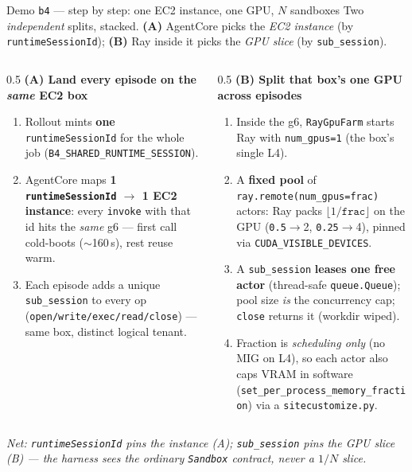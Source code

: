 \documentclass[aspectratio=169]{beamer}
\begin{document}
\begin{frame}{Demo \texttt{b4} --- step by step: one EC2 instance, one GPU, $N$ sandboxes}
  \footnotesize Two \emph{independent} splits, stacked. \textbf{(A)} AgentCore picks the \emph{EC2
  instance} (by \texttt{runtimeSessionId}); \textbf{(B)} Ray inside it picks the \emph{GPU slice} (by \texttt{sub\_session}).
  \begin{columns}[T]
    \begin{column}{0.5\textwidth}
      \textbf{(A) Land every episode on the \emph{same} EC2 box}
      \begin{enumerate}\setlength\itemsep{0.03em}
        \item[\textbf{1}] Rollout mints \textbf{one} \texttt{runtimeSessionId} for the whole job (\texttt{B4\_SHARED\_RUNTIME\_SESSION}).
        \item[\textbf{2}] AgentCore maps \textbf{1 \texttt{runtimeSessionId} $\to$ 1 EC2 instance}: every \texttt{invoke} with that id hits the \emph{same} g6 --- first call cold-boots ($\sim$160\,s), rest reuse warm.
        \item[\textbf{3}] Each episode adds a unique \texttt{sub\_session} to every op (\texttt{open/write/exec/read/close}) --- same box, distinct logical tenant.
      \end{enumerate}
    \end{column}
    \begin{column}{0.5\textwidth}
      \textbf{(B) Split that box's one GPU across episodes}
      \begin{enumerate}\setlength\itemsep{0.03em}
        \item[\textbf{4}] Inside the g6, \texttt{RayGpuFarm} starts Ray with \texttt{num\_gpus=1} (the box's single L4).
        \item[\textbf{5}] A \textbf{fixed pool} of \texttt{ray.remote(num\_gpus=frac)} actors: Ray packs $\lfloor 1/\texttt{frac}\rfloor$ on the GPU (\texttt{0.5}$\to$2, \texttt{0.25}$\to$4), pinned via \texttt{CUDA\_VISIBLE\_DEVICES}.
        \item[\textbf{6}] A \texttt{sub\_session} \textbf{leases one free actor} (thread-safe \texttt{queue.Queue}); pool size \emph{is} the concurrency cap; \texttt{close} returns it (workdir wiped).
        \item[\textbf{7}] Fraction is \emph{scheduling only} (no MIG on L4), so each actor also caps VRAM in software (\texttt{set\_per\_process\_memory\_fraction}) via a \texttt{sitecustomize.py}.
      \end{enumerate}
    \end{column}
  \end{columns}
  {\scriptsize\itshape Net: \texttt{runtimeSessionId} pins the \emph{instance} (A); \texttt{sub\_session}
  pins the \emph{GPU slice} (B) --- the harness sees the ordinary \texttt{Sandbox} contract, never a $1/N$ slice.}
\end{frame}
\end{document}
